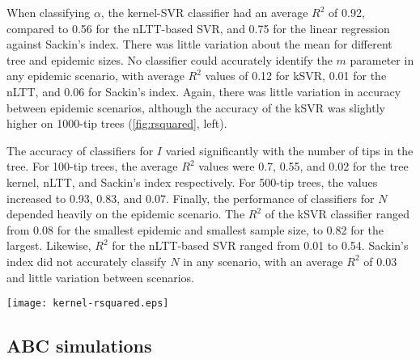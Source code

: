 \documentclass[12pt]{article}\usepackage[]{graphicx}\usepackage[]{color}
\begin{document}
When classifying $\alpha$, the kernel-SVR classifier had an average $R^2$ of 
    0.92,
compared to 
    0.56
for the nLTT-based SVR, and
    0.75
for the linear regression against Sackin's index. There was little variation
about the mean for different tree and epidemic sizes. No classifier could
accurately identify the $m$ parameter in any epidemic scenario, with average
$R^2$ values of 
  0.12 for kSVR,
  0.01 for the nLTT, and
  0.06
for Sackin's index. Again, there was little variation in accuracy between
epidemic scenarios, although the accuracy of the kSVR was slightly higher
on 1000-tip trees (\cref{fig:rsquared}, left).

The accuracy of classifiers for $I$ varied significantly with the number of
tips in the tree. For 100-tip trees, the average $R^2$ values were
  0.7,
  0.55, and
  0.02
for the tree kernel, nLTT, and Sackin's index respectively. For 500-tip
trees, the values increased to
  0.93,
  0.83, and
  0.07.
Finally, the performance of classifiers for $N$ depended heavily on the
epidemic scenario. The $R^2$ of the kSVR classifier ranged from
  0.08
for the smallest epidemic and smallest sample size, to
  0.82
for the largest. Likewise, $R^2$ for the nLTT-based SVR ranged from 
  0.01
to
  0.54.
Sackin's index did not accurately classify $N$ in any scenario, with an average
$R^2$ of
  0.03
and little variation between scenarios.

\begin{figure*}[ht]
  \centering
  \texttt{[image: kernel-rsquared.eps]}
  \vspace{6pt}
  \caption{
      Cross-validation accuracy of kernel-SVR classifier (left), SVR classifier
      using nLTT (centre), and linear regression using Sackin's index
      (right) for BA model parameters. Kernel meta-parameters were set to
      $\lambda = 0.3$ and $\sigma = 4$. Each point was calculated based on 300
      simulated transmission trees over networks with three different values of
      the parameter being tested. Vertical lines are empirical 95\% confidence
      intervals based on 1000 two-fold cross-validations.
  }
  \label{fig:rsquared}
\end{figure*}

\subsection{ABC simulations}
\end{document}
